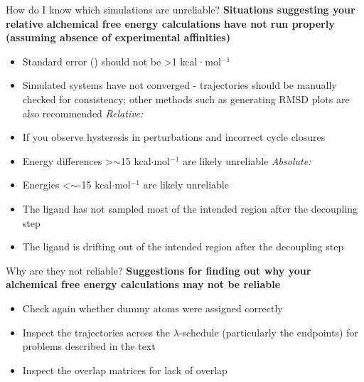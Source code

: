 \documentclass[9pt,bestpractices]{livecoms}
\begin{document}
\begin{Checklists*}
\begin{checklist}{How do I know which simulations are unreliable?}
    \textbf{Situations suggesting your relative alchemical free energy calculations have not run properly (assuming absence of experimental affinities)}
        \begin{itemize}
                \item Standard error (\textsigma) should not be \textgreater1 kcal·mol$^{-1}$ 
    \item Simulated systems have not converged - trajectories should be manually checked for consistency; other methods such as generating RMSD plots are also recommended
    \newline\newline\textit{Relative:}
    \item If you observe hysteresis in perturbations and incorrect cycle closures
    \item Energy differences \textgreater$\sim$15 kcal$\cdot$mol$^{-1}$  are likely unreliable
    \newline\newline\textit{Absolute:}
    \item Energies \textless$\sim$-15 kcal$\cdot$mol$^{-1}$  are likely unreliable
    \item The ligand has not sampled most of the intended region after the decoupling step
    \item The ligand is drifting out of the intended region after the decoupling step
        \end{itemize}
\end{checklist}

\begin{checklist}{Why are they not reliable?}
    \textbf{Suggestions for finding out why your alchemical free energy calculations may not be reliable}
\begin{itemize}
    \item Check again whether dummy atoms were assigned correctly
    \item Inspect the trajectories across the $\lambda$-schedule (particularly the endpoints) for problems described in the text
    \item Inspect the overlap matrices for lack of overlap
\end{itemize}
\end{checklist}


\end{Checklists*}
\end{document}
